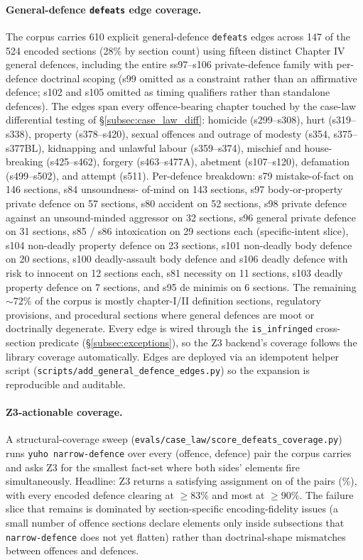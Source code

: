 \paragraph{General-defence \texttt{defeats} edge coverage.}
The corpus carries 610 explicit general-defence \texttt{defeats}
edges across 147 of the 524 encoded sections (28\% by section
count) using fifteen distinct Chapter IV general defences,
including the entire ss97--s106 private-defence family with
per-defence doctrinal scoping (s99 omitted as a constraint
rather than an affirmative defence; s102 and s105 omitted as
timing qualifiers rather than standalone defences). The
edges span every offence-bearing chapter touched by the case-law
differential testing of \S\ref{subsec:case_law_diff}: homicide
(s299--s308), hurt (s319--s338), property (s378--s420), sexual
offences and outrage of modesty (s354, s375--s377BL), kidnapping
and unlawful labour (s359--s374), mischief and house-breaking
(s425--s462), forgery (s463--s477A), abetment (s107--s120),
defamation (s499--s502), and attempt (s511). Per-defence
breakdown: s79 mistake-of-fact on 146 sections, s84 unsoundness-
of-mind on 143 sections, s97 body-or-property private defence on
57 sections, s80 accident on 52 sections, s98 private defence
against an unsound-minded aggressor on 32 sections, s96 general
private defence on 31 sections, s85 / s86 intoxication on 29
sections each (specific-intent slice), s104 non-deadly property
defence on 23 sections, s101 non-deadly body defence on 20
sections, s100 deadly-assault body defence and s106 deadly
defence with risk to innocent on 12 sections each, s81 necessity
on 11 sections, s103 deadly property defence on 7 sections, and
s95 de minimis on 6 sections. The remaining ${\sim}72\%$ of the
corpus is mostly chapter-I/II definition sections, regulatory
provisions, and procedural sections where general defences are
moot or doctrinally degenerate. Every edge is wired through
the \texttt{is\_infringed} cross-section predicate
(\S\ref{subsec:exceptions}), so the Z3 backend's coverage
follows the library coverage automatically. Edges are deployed
via an idempotent helper script
(\texttt{scripts/add\_general\_defence\_edges.py}) so the
expansion is reproducible and auditable.

\paragraph{Z3-actionable coverage.}
A structural-coverage sweep
(\texttt{evals/case\_law/score\_defeats\_coverage.py}) runs
\texttt{yuho narrow-defence} over every
\statDefeatsCoverageN{} (offence, defence) pair the corpus
carries and asks Z3 for the smallest fact-set where both
sides' elements fire simultaneously. Headline: Z3 returns a
satisfying assignment on \statDefeatsCoverageSat{} of the
\statDefeatsCoverageN{} pairs
(\statDefeatsCoverageRate{}\%), with every encoded defence
clearing at $\geq 83\%$ and most at $\geq 90\%$. The failure
slice that remains is dominated by section-specific
encoding-fidelity issues (a small number of offence sections
declare elements only inside subsections that
\texttt{narrow-defence} does not yet flatten) rather than
doctrinal-shape mismatches between offences and defences.

